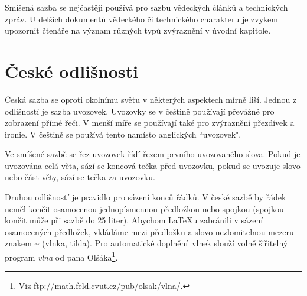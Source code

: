 \documentclass[twocolumn,11pt,a4paper]{article}
\begin{document}
Smíšená sazba se nejčastěji používá pro sazbu vědeckých článků a technických zpráv. U delších dokumentů vědeckého či technického charakteru je zvykem upozornit čtenáře na význam různých typů zvýraznění v úvodní kapitole.

\section{České odlišnosti}

Česká sazba se oproti okolnímu světu v některých aspektech mírně liší. Jednou z odlišností je sazba uvozovek. Uvozovky se v češtině používají převážně pro zobrazení přímé řeči. V menší míře se používají také pro zvýraznění přezdívek a ironie. V češtině se používá tento  namísto anglických ``uvozovek".

Ve smíšené sazbě se řez uvozovek řídí řezem prvního uvozovaného slova. Pokud je uvozována celá věta, sází se koncová tečka před uvozovku, pokud se uvozuje slovo nebo část věty, sází se tečka za uvozovku.

Druhou odlišností je pravidlo pro sázení konců řádků. V české sazbě by řádek neměl končit osamocenou jednopísmennou předložkou nebo spojkou (spojkou  končit může při sazbě do 25 liter). Abychom \LaTeX u zabránili v sázení osamocených předložek, vkládáme mezi předložku a slovo nezlomitelnou mezeru znakem \~{} (vlnka, tilda). Pro automatické doplnění~vlnek slouží volně šiřitelný program \emph{vlna} od pana Olšáka\footnote{Viz ftp://math.feld.cvut.cz/pub/olsak/vlna/.}.
\end{document}
